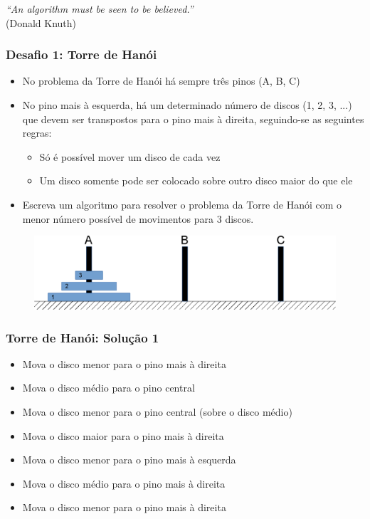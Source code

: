 \documentclass[aspectratio=169]{beamer}
\begin{document}
\begin{frame}
\vspace{6cm}
\begin{flushright}
\emph{``An algorithm must be seen to be believed.''}\\
(Donald Knuth)
\end{flushright}
\end{frame}

\begin{frame}\frametitle{Desafio 1: Torre de Hanói}
\begin{itemize}
	\item No problema da Torre de Hanói há sempre três pinos (A, B, C)
	\item No pino mais à esquerda, há um determinado número de discos (1, 2, 3, ...) que devem ser transpostos para o pino mais à direita, seguindo-se as seguintes regras:
	\begin{itemize}	
		\item Só é possível mover um disco de cada vez
		\item Um disco somente pode ser colocado sobre outro disco maior do que ele
	\end{itemize}
	\item Escreva um algoritmo para resolver o problema da Torre de Hanói com o menor número possível de movimentos para 3 discos.
\end{itemize}
\begin{figure}[h]
	\centering
	\includegraphics[height=0.3\paperheight]{pucrs-ep-fprog-unidade_01-introducao-laminas-torre_de_hanoi.png}
\end{figure}
\end{frame}

\begin{frame}\frametitle{Torre de Hanói: Solução 1}
\begin{itemize}
	\item Mova o disco menor para o pino mais à direita
	\item Mova o disco médio para o pino central
	\item Mova o disco menor para o pino central (sobre o disco médio)
	\item Mova o disco maior para o pino mais à direita
	\item Mova o disco menor para o pino mais à esquerda
	\item Mova o disco médio para o pino mais à direita
	\item Mova o disco menor para o pino mais à direita
\end{itemize}
\end{frame}
\end{document}

